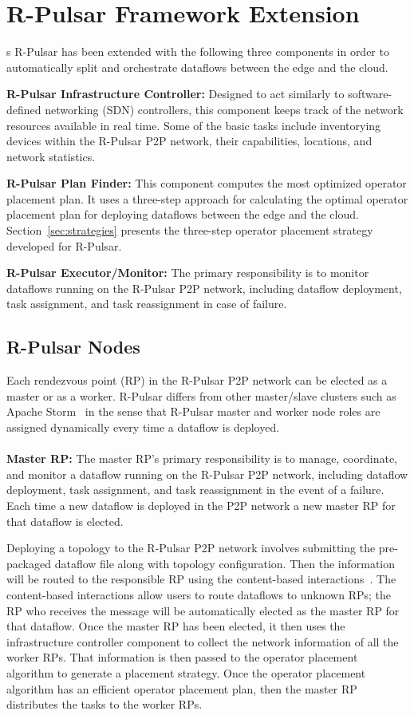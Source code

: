 \section{R-Pulsar Framework Extension}\label{sec:framework}s
R-Pulsar has been extended with the following three components in order to automatically split and orchestrate dataflows between the edge and the cloud. 

\textbf{R-Pulsar Infrastructure Controller:} Designed to act similarly to software-defined networking (SDN) controllers, this component keeps track of the network resources available in real time. Some of the basic tasks include inventorying devices within the R-Pulsar P2P network, their capabilities, locations, and network statistics.

\textbf{R-Pulsar Plan Finder:} This component computes the most optimized operator placement plan. It uses a three-step approach for calculating the optimal operator placement plan for deploying dataflows between the edge and the cloud. Section~\ref{sec:strategies} presents the three-step operator placement strategy developed for R-Pulsar.

\textbf{R-Pulsar Executor/Monitor:} The primary responsibility is to monitor dataflows running on the R-Pulsar P2P network, including dataflow deployment, task assignment, and task reassignment in case of failure.

\subsection{R-Pulsar Nodes}

Each rendezvous point (RP) in the R-Pulsar P2P network can be elected as a master or as a worker. R-Pulsar differs from other master/slave clusters such as Apache Storm~\cite{storm} in the sense that R-Pulsar master and worker node roles are assigned dynamically every time a dataflow is deployed. 
\\\\
\textbf{Master RP:}
The master RP's primary responsibility is to manage, coordinate, and monitor a dataflow running on the R-Pulsar P2P network, including dataflow deployment, task assignment, and task reassignment in the event of a failure. Each time a new dataflow is deployed in the P2P network a new master RP for that dataflow is elected.

Deploying a topology to the R-Pulsar P2P network involves submitting the pre-packaged dataflow file along with topology configuration. Then the information will be routed to the responsible RP using the content-based interactions~\cite{Renart2018EdgeBD}. The content-based interactions allow users to route dataflows to unknown RPs; the RP who receives the message will be automatically elected as the master RP for that dataflow. Once the master RP has been elected, it then uses the infrastructure controller component to collect the network information of all the worker RPs. That information is then passed to the operator placement algorithm to generate a placement strategy. Once the operator placement algorithm has an efficient operator placement plan, then the master RP distributes the tasks to the worker RPs.

